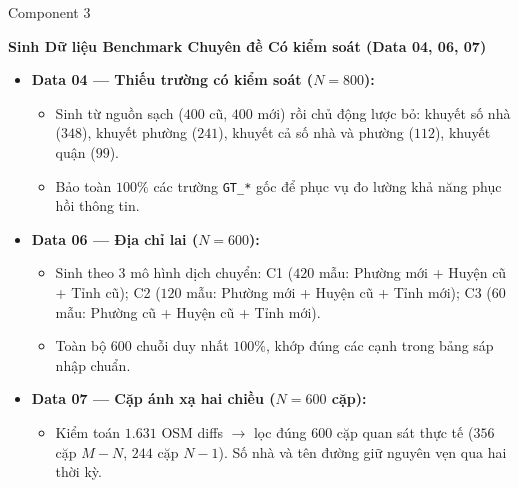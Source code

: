 \documentclass[aspectratio=169,9pt]{beamer}
\begin{document}
\begin{frame}{Component 3}
  \vspace{0.05cm}
  \centerline{\large\textbf{Sinh Dữ liệu Benchmark Chuyên đề Có kiểm soát (Data 04, 06, 07)}}
  \vspace{0.2cm}

  \begin{itemize}
    \setlength{\itemsep}{5pt}
    \item \textbf{Data 04 — Thiếu trường có kiểm soát ($N = 800$):}
      \begin{itemize}
        \setlength{\itemsep}{2pt}
        \item Sinh từ nguồn sạch ($400$ cũ, $400$ mới) rồi chủ động lược bỏ: khuyết số nhà ($348$), khuyết phường ($241$), khuyết cả số nhà và phường ($112$), khuyết quận ($99$).
        \item Bảo toàn $100\%$ các trường \texttt{GT\_*} gốc để phục vụ đo lường khả năng phục hồi thông tin.
      \end{itemize}
    \item \textbf{Data 06 — Địa chỉ lai ($N = 600$):}
      \begin{itemize}
        \setlength{\itemsep}{2pt}
        \item Sinh theo 3 mô hình dịch chuyển: C1 ($420$ mẫu: Phường mới + Huyện cũ + Tỉnh cũ); C2 ($120$ mẫu: Phường mới + Huyện cũ + Tỉnh mới); C3 ($60$ mẫu: Phường cũ + Huyện cũ + Tỉnh mới).
        \item Toàn bộ $600$ chuỗi duy nhất $100\%$, khớp đúng các cạnh trong bảng sáp nhập chuẩn.
      \end{itemize}
    \item \textbf{Data 07 — Cặp ánh xạ hai chiều ($N = 600$ cặp):}
      \begin{itemize}
        \setlength{\itemsep}{2pt}
        \item Kiểm toán $1.631$ OSM diffs $\to$ lọc đúng $600$ cặp quan sát thực tế ($356$ cặp $M - N$, $244$ cặp $N - 1$). Số nhà và tên đường giữ nguyên vẹn qua hai thời kỳ.
      \end{itemize}
  \end{itemize}
\end{frame}
\end{document}
